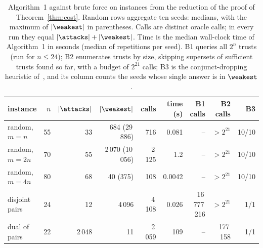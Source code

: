 \begin{table}[t]
\caption{Algorithm~1 against brute force on instances from the reduction of
the proof of Theorem~\ref{thm:cost}. Random rows aggregate ten seeds: medians, with the maximum
of $|\weakest|$ in parentheses. Calls are distinct oracle calls; in every run they
equal $|\attacks|+|\weakest|$. Time is the median wall-clock time of Algorithm~1 in
seconds (median of repetitions per seed). B1 queries all $2^n$ trusts (run for $n \le
24$); B2 enumerates trusts by size, skipping supersets of sufficient trusts found so
far, with a budget of $2^{21}$ calls; B3 is the conjunct-dropping heuristic of~\cite{rowe}, and
its column counts the seeds whose single answer is in $\weakest$.}
\label{tab:scale}
\centering
\setlength{\tabcolsep}{2.4pt}
\footnotesize
\begin{tabular}{lrrrrrrrr}
\toprule
instance & $n$ & $|\attacks|$ & $|\weakest|$ & calls & time (s) & B1 calls & B2 calls & B3\\
\midrule
random, $m=n$                & 55 & 33 & 684 (29\,886) & 716 & 0.081 & -- & $>2^{21}$ & 10/10\\
random, $m=2n$               & 70 & 55 & 2\,070 (10\,056) & 2\,125 & 1.2 & -- & $>2^{21}$ & 10/10\\
random, $m=4n$               & 80 & 68 & 40 (375) & 108 & 0.0042 & -- & $>2^{21}$ & 10/10\\
disjoint pairs               & 24 & 12 & 4\,096 & 4\,108 & 0.026 & 16\,777\,216 & $>2^{21}$ & 1/1\\
dual of pairs                & 22 & 2\,048 & 11 & 2\,059 & 109 & -- & 177\,158 & 1/1\\
\bottomrule
\end{tabular}
\end{table}
